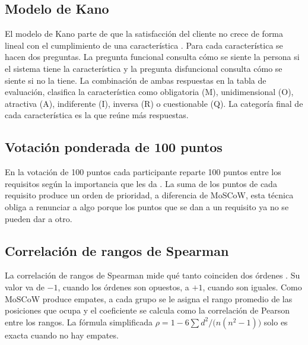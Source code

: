 \subsection{Modelo de Kano}

El modelo de Kano parte de que la satisfacción del cliente no crece de forma lineal con el cumplimiento de una característica \cite{kano1984}. Para cada característica se hacen dos preguntas. La pregunta funcional consulta cómo se siente la persona si el sistema tiene la característica y la pregunta disfuncional consulta cómo se siente si no la tiene. La combinación de ambas respuestas en la tabla de evaluación, clasifica la característica como obligatoria (M), unidimensional (O), atractiva (A), indiferente (I), inversa (R) o cuestionable (Q). La categoría final de cada característica es la que reúne más respuestas.

\subsection{Votación ponderada de 100 puntos}

En la votación de 100 puntos cada participante reparte 100 puntos entre los requisitos según la importancia que les da \cite[\nopp cap.~16]{wiegers2013}. La suma de los puntos de cada requisito produce un orden de prioridad, a diferencia de MoSCoW, esta técnica obliga a renunciar a algo porque los puntos que se dan a un requisito ya no se pueden dar a otro.

\subsection{Correlación de rangos de Spearman}

La correlación de rangos de Spearman mide qué tanto coinciden dos órdenes \cite{spearman1904}. Su valor va de $-1$, cuando los órdenes son opuestos, a $+1$, cuando son iguales. Como MoSCoW produce empates, a cada grupo se le asigna el rango promedio de las posiciones que ocupa y el coeficiente se calcula como la correlación de Pearson entre los rangos. La fórmula simplificada $\rho = 1 - 6\sum d^2 / \bigl(n(n^2 - 1)\bigr)$ solo es exacta cuando no hay empates.
